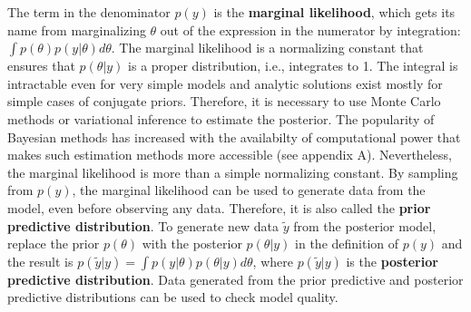 The term in the denominator $p(y)$ is the \textbf{marginal likelihood}, which gets its name from marginalizing $\theta$ out of the expression in the numerator by integration: $\int p(\theta) p(y|\theta)d\theta$.
The marginal likelihood is a normalizing constant that ensures that $p(\theta|y)$ is a proper distribution, i.e., integrates to 1.
The integral is intractable even for very simple models and analytic solutions exist mostly for simple cases of conjugate priors.
Therefore, it is necessary to use Monte Carlo methods or variational inference to estimate the posterior.
The popularity of Bayesian methods has increased with the availabilty of computational power that makes such estimation methods more accessible (see appendix A).
Nevertheless, the marginal likelihood is more than a simple normalizing constant.
By sampling from $p(y)$, the marginal likelihood can be used to generate data from the model, even before observing any data.
Therefore, it is also called the \textbf{prior predictive distribution}.
To generate new data  $\tilde y$ from the posterior model, replace the prior $p(\theta)$ with the posterior $p(\theta|y)$ in the definition of $p(y)$ and the result is $p(\tilde y|y) = \int p(y | \theta) p(\theta|y) d\theta$, where $p(\tilde y | y)$ is the \textbf{posterior predictive distribution}.
Data generated from the prior predictive and posterior predictive distributions can be used to check model quality.



